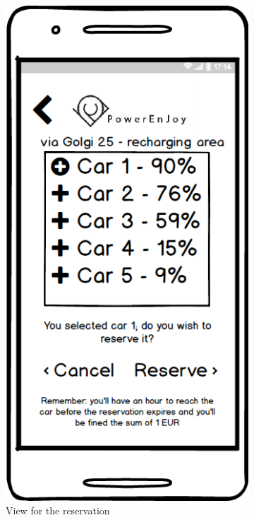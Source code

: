 	\begin{figure}[h]
 
		\begin{subfigure}{0.3\textwidth}
			\includegraphics[scale=0.25]{img/mockups/User_reservation.png}
			\caption{View for the reservation}
			\label{fig:subim1}
		\end{subfigure}
		\begin{subfigure}{0.3\textwidth}

\end{subfigure}
\end{figure}
